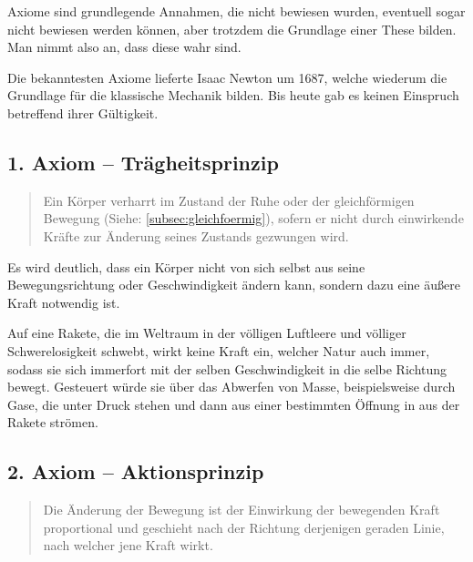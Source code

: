 Axiome sind grundlegende Annahmen, die nicht bewiesen wurden, eventuell sogar nicht bewiesen werden können, aber trotzdem die Grundlage einer These bilden. Man nimmt also an, dass diese wahr sind.

Die bekanntesten Axiome lieferte Isaac Newton um 1687, welche wiederum die Grundlage für die klassische Mechanik bilden. Bis heute gab es keinen Einspruch betreffend ihrer Gültigkeit.

\subsection{1. Axiom -- Trägheitsprinzip}

\begin{quote}
\glqq Ein Körper verharrt im Zustand der Ruhe oder der gleichförmigen Bewegung (Siehe: \ref{subsec:gleichfoermig}), sofern er nicht durch einwirkende Kräfte zur Änderung seines Zustands gezwungen wird.\grqq {}
\end{quote}

\noindent Es wird deutlich, dass ein Körper nicht von sich selbst aus seine Bewegungsrichtung oder Geschwindigkeit ändern kann, sondern dazu eine äußere Kraft notwendig ist.

\begin{Beispiel}
	Auf eine Rakete, die im Weltraum in der völligen Luftleere und völliger Schwerelosigkeit schwebt, wirkt keine Kraft ein, welcher Natur auch immer, sodass sie sich immerfort mit der selben Geschwindigkeit in die selbe Richtung bewegt. Gesteuert würde sie über das \glqq Abwerfen\grqq{} von Masse, beispielsweise durch Gase, die unter Druck stehen und dann aus einer bestimmten Öffnung in aus der Rakete strömen.
\end{Beispiel}


\subsection{2. Axiom -- Aktionsprinzip}

\begin{quote}
\glqq Die Änderung der Bewegung ist der Einwirkung der bewegenden Kraft proportional und geschieht nach der Richtung derjenigen geraden Linie, nach welcher jene Kraft wirkt.\grqq {}
\end{quote}

